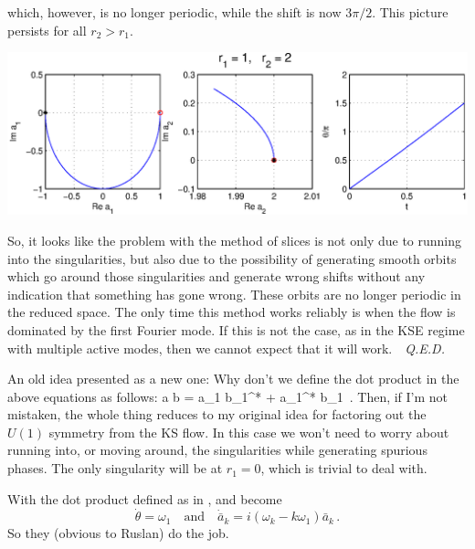 which, however, is no longer periodic, while the shift is now $3\pi/2$.  This picture persists for all $r_2 > r_1$.

\vspace{2ex}\noindent\includegraphics[width=\textwidth]{sliceflow7}

So, it looks like the problem with the method of slices is not only due to running into the singularities,
but also due to the possibility of generating smooth orbits which go around those singularities
and generate wrong shifts without any indication that something has gone wrong.
These orbits are no longer periodic in the reduced space.  The only time this method works
reliably is when the flow is dominated by the first Fourier mode.  If this is not the case,
as in the KSE regime with multiple active modes, then we cannot expect that it will work.~~{\em Q.E.D.}

\vspace{2ex}
An old idea presented as a new one:  Why don't we define the dot product in the above equations as follows:
\beq
 a \cdot b = a_1 b_1^* + a_1^* b_1
 \,.
Then, if I'm not mistaken, the whole thing reduces to my original idea for factoring out the $U(1)$
symmetry from the KS flow.  In this case we won't need to worry about running into, or moving around,
the singularities while generating spurious phases.  The only singularity will be at $r_1 = 0$,
which is trivial to deal with.

With the dot product defined as in ,
 and  become
\[
  \dot{\theta} = \omega_1
  \quad \mathrm{and} \quad
  \dot{\bar{a}}_k = i(\omega_k - k\omega_1) \bar{a}_k
\,.
\]
So they (obvious to Ruslan) do the job.


